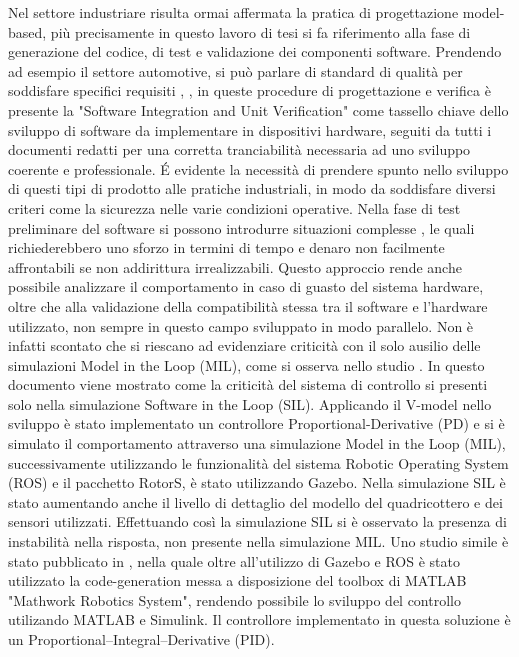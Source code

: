 Nel settore industriare risulta ormai affermata la pratica di progettazione model-based, più precisamente in questo lavoro di tesi si fa riferimento alla fase di generazione del codice, di test e validazione dei componenti software. Prendendo ad esempio il settore automotive, si può parlare di standard di qualità  per soddisfare specifici requisiti \cite{iso26262}, \cite{AutoSPICE}, in queste procedure di progettazione e verifica è presente la "Software Integration and Unit Verification" come tassello chiave dello sviluppo di software da implementare in dispositivi hardware, seguiti da tutti i documenti redatti per una corretta tranciabilità necessaria ad uno sviluppo coerente e professionale. \'E evidente la necessità di prendere spunto nello sviluppo di questi tipi di prodotto alle pratiche industriali, in modo da soddisfare diversi criteri come la sicurezza nelle varie condizioni operative. Nella fase di test preliminare del software si possono introdurre situazioni complesse \cite{MIL_Auto}, le quali richiederebbero uno sforzo in termini di tempo e denaro non facilmente affrontabili se non addirittura irrealizzabili. Questo approccio rende anche possibile analizzare il comportamento in caso di guasto del sistema hardware, oltre che alla validazione della compatibilità stessa tra il software e l'hardware utilizzato, non sempre in questo campo sviluppato in modo parallelo.
Non è infatti scontato che si riescano ad evidenziare criticità con il solo ausilio delle simulazioni Model in the Loop (MIL), come si osserva nello studio \cite{SIL_Improv}. In questo documento viene mostrato come la criticità del sistema di controllo si presenti solo nella simulazione Software in the Loop (SIL). Applicando il V-model nello sviluppo è stato implementato un controllore Proportional-Derivative (PD) e si è simulato il comportamento attraverso una simulazione Model in the Loop (MIL), successivamente utilizzando le funzionalità del sistema Robotic Operating System (ROS) e il pacchetto RotorS, è stato utilizzando Gazebo. Nella simulazione SIL è stato aumentando anche il livello di dettaglio del modello del quadricottero e dei sensori utilizzati. Effettuando così la simulazione SIL si è osservato la presenza di instabilità nella risposta, non presente nella simulazione MIL.
Uno studio simile è stato pubblicato in \cite{CrazyS}, nella quale oltre all'utilizzo di Gazebo e ROS è stato utilizzato la code-generation messa a disposizione del toolbox di MATLAB "Mathwork Robotics System", rendendo possibile lo sviluppo del controllo utilizando MATLAB e Simulink. Il controllore implementato in questa soluzione è un Proportional–Integral–Derivative (PID).
